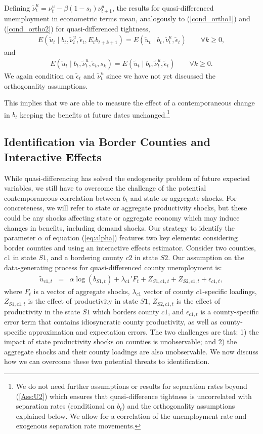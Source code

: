 \documentclass[12pt]{article}
\newcommand{\1}{\mathbf{1}}
\newcommand{\beq}{\begin{eqnarray}}
\newcommand{\eeq}{\end{eqnarray}}
\begin{document}
Defining $\tilde{\nu}^u_t = \nu^u_t   - \beta (1-s_t) \nu^u_{t+1}$, the results for quasi-differenced unemployment in econometric terms mean, analogously to (\ref{cond_ortho1}) and (\ref{cond_ortho2}) for quasi-differenced tightness,
\beq
E( \tilde{u}_t \mid b_t, \tilde{\nu}^u_t, \tilde{\epsilon}_t, E_t b_{t+k+1} ) = E( \tilde{u}_t \mid b_t, \tilde{\nu}^u_t, \tilde{\epsilon}_t)  \qquad \forall k \geq 0,  \label{Ass:U1}
\eeq
and
\beq
E( \tilde{u}_t \mid b_t, \tilde{\nu}^u_t , \tilde{\epsilon}_t, s_k ) = E( \tilde{u}_t \mid b_t, \tilde{\nu}^u_t, \tilde{\epsilon}_t)\qquad \forall k \geq 0. \label{Ass:U2}
\eeq
We again condition on $\tilde{\epsilon}_t$ and $\tilde{\nu}^u_t$ since we have not yet discussed the orthogonality assumptions. 


This implies that we are able to measure the effect of a contemporaneous change in $b_t$ keeping the benefits at future dates unchanged.\footnote{We do not need further assumptions or results for separation rates beyond (\ref{Ass:U2}) which ensures that quasi-difference tightness is uncorrelated with separation rates (conditional on $b_t$) and 
the orthogonality assumptions explained below. We allow for a correlation of the unemployment rate and exogenous separation rate movements.}




\subsection{ \hspace{-.4cm} Identification via Border Counties and Interactive Effects}
\label{sec:bc}
While quasi-differencing has solved the endogeneity problem of future expected variables, we still have to overcome the challenge of the potential contemporaneous correlation between $b_t$ and state or aggregate shocks. For concreteness, we will refer to state or aggregate productivity shocks, but these could be any shocks affecting state or aggregate economy which may induce changes in benefits, including demand shocks. Our strategy to identify the parameter $\alpha$ of equation (\ref{eq:alpha}) features two key elements: considering border counties and using an interactive effects estimator. Consider two counties, $c1$ in state $S1$, and a bordering county $c2$ in state $S2$. Our assumption on the data-generating process for quasi-differenced county unemployment is:
\beq \label{eq:dgp}
\tilde{u}_{c1,t} & = & \alpha \log(b_{S1,t}) + \lambda_{c1}'F_t + Z_{S1,c1,t}+Z_{S2,c1,t}+\epsilon_{c1,t},
\eeq
where $F_t$ is a vector of aggregate shocks, $\lambda_{c1}$ vector of county $c1$-specific loadings, $Z_{S1,c1,t}$ is the effect of productivity in state $S1$, $Z_{S2,c1,t}$ is the effect of productivity in the state $S1$ which borders county $c1$, and $\epsilon_{c1,t}$ is a county-specific error term that contains idiosyncratic county productivity, as well as county-specific approximation and expectation errors. The two challenges are that: 1) the impact of state productivity shocks on counties is unobservable; and 2) the aggregate shocks and their county loadings are also unobservable. We now discuss how we can overcome these two potential threats to identification.
\end{document}
